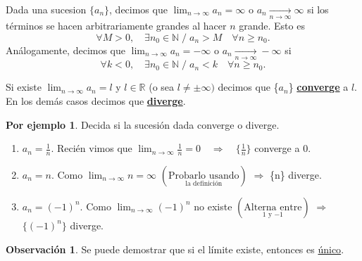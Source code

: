 \documentclass{article}
\theoremstyle{definition}
\newtheorem*{obs}{Observación}
\newtheorem*{ej}{Por ejemplo}
\theoremstyle{remark}
\begin{document}
\pagebreak
\begin{defi}
  Dada una sucesion $\{a _n\}$, decimos que $\lim_{n \to \infty}{a_n}=\infty$ o $a_n\underset{n\to\infty}{\longrightarrow}\infty$ si los términos se hacen arbitrariamente grandes al hacer $n$ grande. Esto es \[
    \forall M > 0, \quad \exists n_0 \in \mathbb{N} \; / \; a_n > M \quad \forall n \geq n_0.
  \]
  Análogamente, decimos que $\lim_{n\to\infty}{a_n}=-\infty$ o $a_n\underset{n\to\infty}{\longrightarrow}-\infty$ si
  \[
    \forall k<0, \quad \exists n_0 \in \mathbb{N} \; / \; a_n < k\quad \forall n \geq n_0.
  \]
\end{defi}
\begin{figure}[h]
\centering
\def\svgwidth{0.75\textwidth}

\end{figure}
\pagebreak
\begin{defi}
Si existe $\lim_{n \to \infty} a_n=l$ y $l \in \mathbb{R}$ (o sea $l \neq \pm \infty)$ decimos que \{$a_n$\} \textbf{\underline{converge}} a $l$. En los demás casos decimos que \underline{\textbf{diverge}}.
\end{defi}
\begin{ej}
Decida si la sucesión dada converge o diverge. \\
\begin{enumerate}
    \item $a_n=\frac{1}{n}$. Recién vimos que $\lim_{n \to \infty }{\frac{1}{n}}=0 \quad \Rightarrow \quad \{\frac{1}{n}\}$ converge a $0$.
    \item $a_n=n$. Como $\lim_{n\to \infty}{n}=\infty$ $\left(\underset{\text{la definición}}{\text{Probarlo usando}}\right)$
      $\Rightarrow$ \{n\} diverge.
    \item $a_n=(-1)^n$. Como $\lim_{n\to \infty}{(-1)^n}$ no existe $\left(\underset{\text{$1$ y $-1$}}{\text{Alterna entre}}\right)$ $\Rightarrow$ $\{(-1)^n\}$ diverge.
\end{enumerate}
\end{ej}

\begin{obs}
  Se puede demostrar que si el límite existe, entonces es \underline{único}.
\end{obs}


\pagebreak
\end{document}
